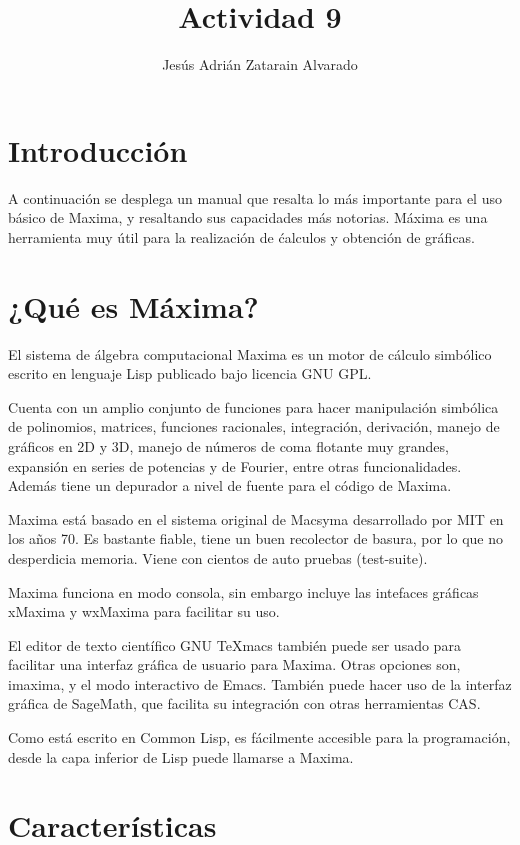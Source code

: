 \documentclass{article}
\title{Actividad 9}
\author{Jesús Adrián Zatarain Alvarado}
\begin{document}
\maketitle

\section{Introducción}

A continuación se desplega un manual que resalta lo más importante para el uso básico de Maxima, y resaltando sus capacidades más notorias. Máxima es una herramienta muy útil para la realización de ćalculos y obtención de gráficas.

\section{¿Qué es Máxima?}

El sistema de álgebra computacional Maxima es un motor de cálculo simbólico escrito en lenguaje Lisp publicado bajo licencia GNU GPL.

Cuenta con un amplio conjunto de funciones para hacer manipulación simbólica de polinomios, matrices, funciones racionales, integración, derivación, manejo de gráficos en 2D y 3D, manejo de números de coma flotante muy grandes, expansión en series de potencias y de Fourier, entre otras funcionalidades. Además tiene un depurador a nivel de fuente para el código de Maxima.

Maxima está basado en el sistema original de Macsyma desarrollado por MIT en los años 70. Es bastante fiable, tiene un buen recolector de basura, por lo que no desperdicia memoria. Viene con cientos de auto pruebas (test-suite).

Maxima funciona en modo consola, sin embargo incluye las intefaces gráficas xMaxima y wxMaxima para facilitar su uso.

El editor de texto científico GNU TeXmacs también puede ser usado para facilitar una interfaz gráfica de usuario para Maxima. Otras opciones son, imaxima, y el modo interactivo de Emacs. También puede hacer uso de la interfaz gráfica de SageMath, que facilita su integración con otras herramientas CAS.

Como está escrito en Common Lisp, es fácilmente accesible para la programación, desde la capa inferior de Lisp puede llamarse a Maxima.

\section{Características}
\end{document}
